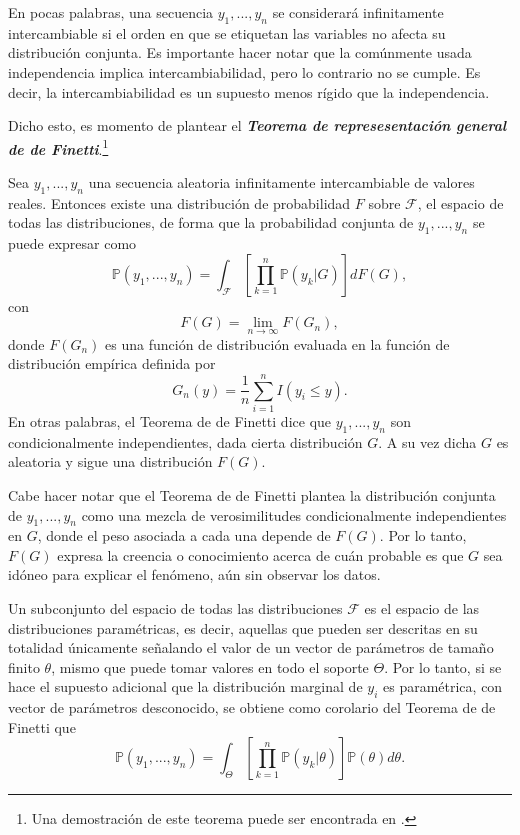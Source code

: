 En pocas palabras, una secuencia $y_1,...,y_n$ se considerar\'a infinitamente intercambiable si el orden en que se etiquetan las variables no afecta su distribuci\'on conjunta. Es importante hacer notar que la com\'unmente usada independencia implica intercambiabilidad, pero lo contrario no se cumple. Es decir, la intercambiabilidad es un supuesto menos r\'igido que la independencia.

Dicho esto, es momento de plantear el \textbf{\textit{Teorema de represesentaci\'on general de de Finetti}}.\footnote{Una demostraci\'on de este teorema puede ser encontrada en \cite{Schervish_TheoryStats}.}

\begin{theorem*}
    Sea $y_1, ...,y_n$ una secuencia aleatoria infinitamente intercambiable de valores reales. Entonces existe una distribuci\'on de probabilidad $F$ sobre $\mathcal{F}$, el espacio de todas las distribuciones, de forma que la probabilidad conjunta de $y_1, ...,y_n$ se puede expresar como
    \begin{equation*}
        \mathbb{P}(y_1, ...,y_n) =
        \int_{\mathcal{F}}\left[\prod_{k=1}^n \mathbb{P}(y_k|G)\right]dF(G),
    \end{equation*}
    con
    \begin{equation*}
        F(G) = \lim_{n \to \infty} F(G_n),
    \end{equation*}
    donde $F(G_n)$ es una funci\'on de distribuci\'on evaluada en la funci\'on de distribuci\'on emp\'irica definida por
    \begin{equation*}
        G_n(y) = \frac{1}{n} \sum_{i=1}^n I(y_i \leq y).
    \end{equation*}
    En otras palabras, el Teorema de de Finetti dice que $y_1, ...,y_n$ son condicionalmente independientes, dada cierta distribuci\'on $G$. A su vez dicha $G$ es aleatoria y sigue una distribuci\'on $F(G)$.
\end{theorem*}

Cabe hacer notar que el Teorema de de Finetti plantea la distribuci\'on conjunta de $y_1, ...,y_n$ como una mezcla de verosimilitudes condicionalmente independientes en $G$, donde el peso asociada a cada una depende de $F(G)$. Por lo tanto, $F(G)$ expresa la creencia o conocimiento acerca de cu\'an probable es que $G$ sea id\'oneo para explicar el fen\'omeno, a\'un sin observar los datos.

Un subconjunto del espacio de todas las distribuciones $\mathcal{F}$ es el espacio de las distribuciones param\'etricas, es decir, aquellas que pueden ser descritas en su totalidad \'unicamente señalando el valor de un vector de par\'ametros de tamaño finito $\theta$, mismo que puede tomar valores en todo el soporte $\Theta$. Por lo tanto, si se hace el supuesto adicional que la distribuci\'on marginal de $y_i$ es param\'etrica, con vector de par\'ametros desconocido, se obtiene como corolario del Teorema de de Finetti que
\begin{equation*}
    \mathbb{P}(y_1, ...,y_n) =
    \int_{\Theta}\left[\prod_{k=1}^n \mathbb{P}(y_k|\theta)\right]\mathbb{P}(\theta)d\theta.
\end{equation*}

